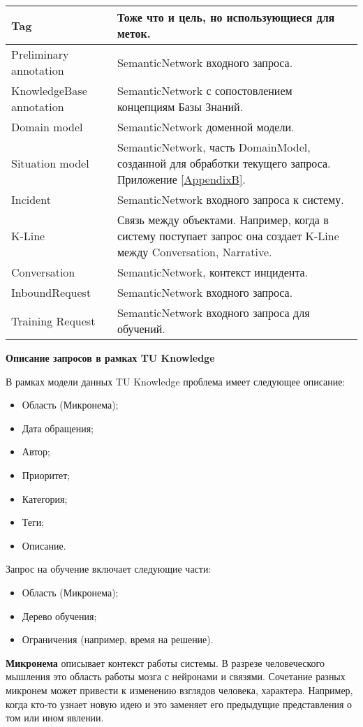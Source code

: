 \begin{longtable}{|p{5cm}|p{12cm}|}
   \hline
   Tag & Тоже что и цель, но использующиеся для меток. \\
   \hline
   Preliminary annotation  & SemanticNetwork входного запроса. \\
   \hline
   KnowledgeBase annotation  & SemanticNetwork с сопостовлением концепциям Базы Знаний. \\
   \hline
   Domain model  & SemanticNetwork доменной модели. \\
   \hline
   Situation model  & SemanticNetwork, часть DomainModel, созданной для обработки текущего запроса. Приложение \ref{AppendixB}. \\
   \hline
   Incident  & SemanticNetwork входного запроса к систему. \\
   \hline
   K-Line  & Связь между объектами. Например, когда в систему поступает запрос она создает K-Line между Conversation, Narrative. \\
   \hline
   Conversation  & SemanticNetwork, контекст инцидента. \\
   \hline
   InboundRequest  & SemanticNetwork входного запроса. \\
   \hline
   Training Request  & SemanticNetwork входного запроса для обучений. \\
   \hline
   
  \end{longtable}

\textbf{Описание запросов в рамках TU Knowledge} \par
В рамках модели данных TU Knowledge проблема имеет следующее описание:
\begin{itemize}
	\item Область (Микронема);
	\item Дата обращения;
	\item Автор;
	\item Приоритет;
	\item Категория;
	\item Теги;
	\item Описание.
\end{itemize}
Запрос на обучение включает следующие части:
\begin{itemize}
	\item Область (Микронема);
	\item Дерево обучения;
	\item Ограничения (например, время на решение).
\end{itemize} \par
 \textbf{Микронема} описывает контекст работы системы. В разрезе человеческого мышления это область работы мозга с нейронами и связями. Сочетание разных микронем может привести к изменению взглядов человека, характера. Например, когда кто-то узнает новую идею и это заменяет его предыдущие представления о том или ином явлении. \par 

